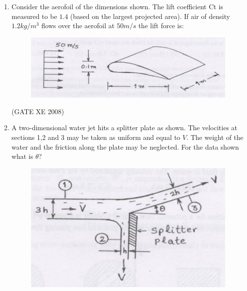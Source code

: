 \documentclass[12pt]{article}
\begin{document}
\begin{enumerate}
\begin{enumerate}
\end{enumerate}


(GATE XE 2008)
\item  Consider the aerofoil of the dimensions shown. The lift coefficient Ct is measured to be $1.4$ (based on the largest projected area). If air of density $1.2 kg/m^3$ flows over the aerofoil at $50 m/s$ the lift force is:

\begin{figure}[H]
\centering
  \includegraphics[width=0.5\columnwidth]{figs/ass1_d_q14.png}
  \caption{}
\end{figure} 

\begin{enumerate}
\end{enumerate}

(GATE XE 2008)
\item A two-dimensional water jet hits a splitter plate as shown. The velocities at sections 1,2 and 3 may be taken as uniform and equal to $V$. The weight of the water and the friction along the plate may be neglected. For the data shown what is $\theta$?

\begin{figure}[H]
\centering
  \includegraphics[width=0.5\columnwidth]{figs/ass1_d_q15.png}
  \caption{}
\end{figure} 


\end{enumerate}
\end{document}
